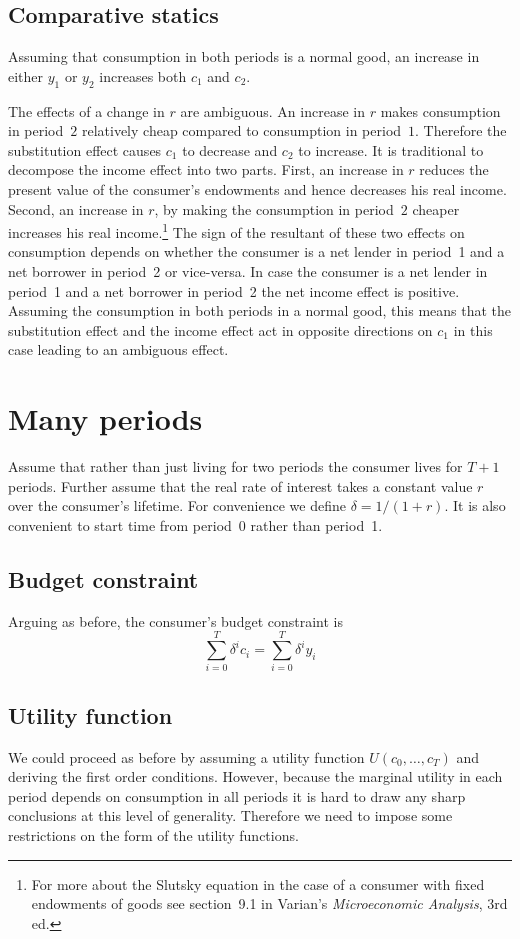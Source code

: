 \documentclass[11pt,reqno,openany]{amsbook}
\theoremstyle{plain}
\theoremstyle{definition}
\begin{document}
\subsection{Comparative statics}
Assuming that consumption in both periods is a normal good, an
increase in either $y_1$ or $y_2$ increases both $c_1$ and $c_2$.

The effects of a change in $r$ are ambiguous. An increase in $r$ makes
consumption in period~$2$ relatively cheap compared to consumption in
period~$1$. Therefore the substitution effect causes $c_1$ to decrease
and $c_2$ to increase. It is traditional to decompose the income
effect into two parts. First, an increase in $r$ reduces the present
value of the consumer's endowments and hence decreases his real
income. Second, an increase in $r$, by making the consumption in
period~$2$ cheaper increases his real income.\footnote{
For more about the Slutsky equation in the case of a consumer with
fixed endowments of goods see section~9.1 in Varian's
\emph{Microeconomic Analysis}, 3rd ed.} The sign of the
resultant of these two effects on consumption depends on whether the
consumer is a net lender in period~1 and a net borrower in period~2 or
vice-versa. In case the consumer is a net lender in period~1 and a net
borrower in period~2 the net income effect is positive. Assuming the
consumption in both periods in a normal good, this means that the
substitution effect and the income effect act in opposite directions
on $c_1$ in this case leading to an ambiguous effect.

\section{Many periods}
Assume that rather than just living for two periods the consumer lives
for $T+1$ periods. Further assume that the real rate of interest takes a
constant value $r$ over the consumer's lifetime. For convenience we
define $\delta=1/(1+r)$. It is also convenient to start time from
period~0 rather than period~1.

\subsection{Budget constraint}
Arguing as before, the consumer's budget constraint is
\begin{equation}\label{eq:many-period-budget}
\sum_{i=0}^T \delta^i c_i = \sum_{i=0}^T \delta^i y_i
\end{equation}

\subsection{Utility function}
We could proceed as before by assuming a utility function
$U(c_0,\ldots,c_T)$ and deriving the first order conditions. However,
because the marginal utility in each period depends on consumption in
all periods it is hard to draw any sharp conclusions at this level of
generality. Therefore we need to impose some restrictions on the form
of the utility functions.
\end{document}
